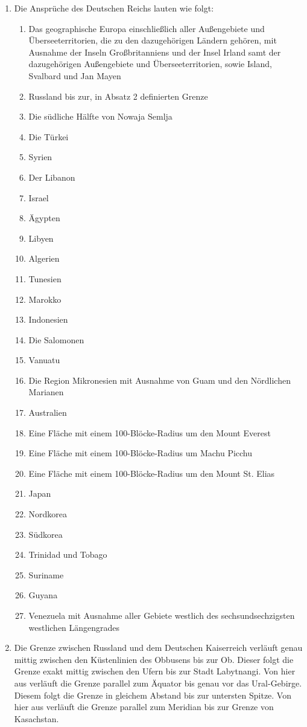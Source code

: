 \documentclass{article}
\begin{document}
\begin{enumerate}[(1)]
    \item Die Ansprüche des Deutschen Reichs lauten wie folgt:
    \begin{enumerate}[1.]
        \item Das geographische Europa einschließlich aller Außengebiete und Überseeterritorien, die zu den dazugehörigen Ländern gehören, mit Ausnahme der Inseln Großbritanniens und der Insel Irland samt der dazugehörigen Außengebiete und Überseeterritorien, sowie Island, Svalbard und Jan Mayen
        \item Russland bis zur, in Absatz 2 definierten Grenze
        \item Die südliche Hälfte von Nowaja Semlja
        \item Die Türkei
        \item Syrien
        \item Der Libanon
        \item Israel
        \item Ägypten
        \item Libyen
        \item Algerien
        \item Tunesien
        \item Marokko
        \item Indonesien
        \item Die Salomonen
        \item Vanuatu
        \item Die Region Mikronesien mit Ausnahme von Guam und den Nördlichen Marianen
        \item Australien
        \item Eine Fläche mit einem 100-Blöcke-Radius um den Mount Everest
        \item Eine Fläche mit einem 100-Blöcke-Radius um Machu Picchu
        \item Eine Fläche mit einem 100-Blöcke-Radius um den Mount St. Elias
        \item Japan
        \item Nordkorea
        \item Südkorea
        \item Trinidad und Tobago
        \item Suriname
        \item Guyana
        \item Venezuela mit Ausnahme aller Gebiete westlich des sechsundsechzigsten westlichen Längengrades
    \end{enumerate}
    \item Die Grenze zwischen Russland und dem Deutschen Kaiserreich verläuft genau mittig zwischen den Küstenlinien des Obbusens bis zur Ob. Dieser folgt die Grenze exakt mittig zwischen den Ufern bis zur Stadt Labytnangi. Von hier aus verläuft die Grenze parallel zum Äquator bis genau vor das Ural-Gebirge. Diesem folgt die Grenze in gleichem Abstand bis zur untersten Spitze. Von hier aus verläuft die Grenze parallel zum Meridian bis zur Grenze von Kasachstan.    
\end{enumerate}
\end{document}
